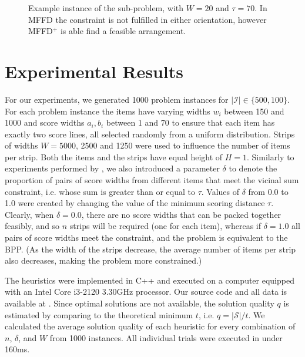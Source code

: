 \documentclass[runningheads]{llncs}
\begin{document}
\begin{figure}[H]	
	\centering
	
	\caption{Example instance of the sub-problem, with $W = 20$ and $\tau = 70$. In MFFD the constraint is not fulfilled in either orientation, however MFFD$^+$ is able find a feasible arrangement.}	
	\label{fig:comparestrips}
\end{figure}


\section{Experimental Results}
For our experiments, we generated 1000 problem instances for $|\mathcal{I}| \in \{500, 100\}$. For each problem instance the items have varying widths $w_i$ between 150 and 1000 and score widths $a_i, b_i$ between 1 and 70 to ensure that each item has exactly two score lines, all selected randomly from a uniform distribution. Strips of widths $W = 5000$, 2500 and 1250 were used to influence the number of items per strip. Both the items and the strips have equal height of $H = 1$. Similarly to experiments performed by \cite{lewis2011}, we also introduced a parameter $\delta$ to denote the proportion of pairs of score widths from different items that meet the vicinal sum constraint, i.e. whose sum is greater than or equal to $\tau$. Values of $\delta$ from 0.0 to 1.0 were created by changing the value of the minimum scoring distance $\tau$. Clearly, when $\delta = 0.0$, there are no score widths that can be packed together feasibly, and so $n$ strips will be required (one for each item), whereas if $\delta = 1.0$ all pairs of score widths meet the constraint, and the problem is equivalent to the BPP. (As the width of the strips decrease, the average number of items per strip also decreases, making the problem more constrained.)

The heuristics were implemented in C++ and executed on a computer equipped with an Intel Core i3-2120 3.30GHz processor. Our source code and all data is available at \cite{hawa2018}. Since optimal solutions are not available, the solution quality $q$ is estimated by comparing to the theoretical minimum $t$, i.e. $q = |\mathcal{S}| / t$. We calculated the average solution quality of each heuristic for every combination of $n$, $\delta$, and $W$ from 1000 instances. All individual trials were executed in under 160ms.
\end{document}
